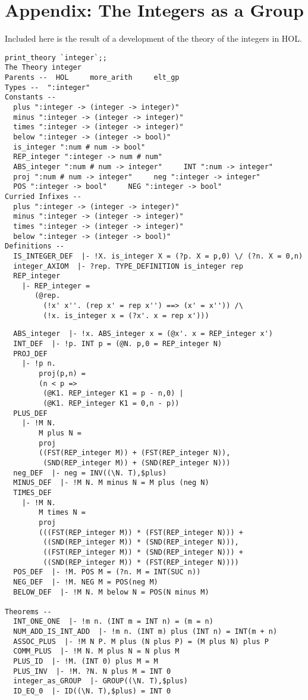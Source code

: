 \section{Appendix: The Integers as a Group}

Included here is the result of a development of the theory of the integers
in HOL.

\begin{verbatim}
print_theory `integer`;;
The Theory integer
Parents --  HOL     more_arith     elt_gp     
Types --  ":integer"     
Constants --
  plus ":integer -> (integer -> integer)"
  minus ":integer -> (integer -> integer)"
  times ":integer -> (integer -> integer)"
  below ":integer -> (integer -> bool)"
  is_integer ":num # num -> bool"
  REP_integer ":integer -> num # num"
  ABS_integer ":num # num -> integer"     INT ":num -> integer"
  proj ":num # num -> integer"     neg ":integer -> integer"
  POS ":integer -> bool"     NEG ":integer -> bool"     
Curried Infixes --
  plus ":integer -> (integer -> integer)"
  minus ":integer -> (integer -> integer)"
  times ":integer -> (integer -> integer)"
  below ":integer -> (integer -> bool)"     
Definitions --
  IS_INTEGER_DEF  |- !X. is_integer X = (?p. X = p,0) \/ (?n. X = 0,n)
  integer_AXIOM  |- ?rep. TYPE_DEFINITION is_integer rep
  REP_integer
    |- REP_integer =
       (@rep.
         (!x' x''. (rep x' = rep x'') ==> (x' = x'')) /\
         (!x. is_integer x = (?x'. x = rep x')))
\end{verbatim}
\newpage
\begin{verbatim}
  ABS_integer  |- !x. ABS_integer x = (@x'. x = REP_integer x')
  INT_DEF  |- !p. INT p = (@N. p,0 = REP_integer N)
  PROJ_DEF
    |- !p n.
        proj(p,n) =
        (n < p => 
         (@K1. REP_integer K1 = p - n,0) | 
         (@K1. REP_integer K1 = 0,n - p))
  PLUS_DEF
    |- !M N.
        M plus N =
        proj
        ((FST(REP_integer M)) + (FST(REP_integer N)),
         (SND(REP_integer M)) + (SND(REP_integer N)))
  neg_DEF  |- neg = INV((\N. T),$plus)
  MINUS_DEF  |- !M N. M minus N = M plus (neg N)
  TIMES_DEF
    |- !M N.
        M times N =
        proj
        (((FST(REP_integer M)) * (FST(REP_integer N))) +
         ((SND(REP_integer M)) * (SND(REP_integer N))),
         ((FST(REP_integer M)) * (SND(REP_integer N))) +
         ((SND(REP_integer M)) * (FST(REP_integer N))))
  POS_DEF  |- !M. POS M = (?n. M = INT(SUC n))
  NEG_DEF  |- !M. NEG M = POS(neg M)
  BELOW_DEF  |- !M N. M below N = POS(N minus M)

Theorems --
  INT_ONE_ONE  |- !m n. (INT m = INT n) = (m = n)
  NUM_ADD_IS_INT_ADD  |- !m n. (INT m) plus (INT n) = INT(m + n)
  ASSOC_PLUS  |- !M N P. M plus (N plus P) = (M plus N) plus P
  COMM_PLUS  |- !M N. M plus N = N plus M
  PLUS_ID  |- !M. (INT 0) plus M = M
  PLUS_INV  |- !M. ?N. N plus M = INT 0
  integer_as_GROUP  |- GROUP((\N. T),$plus)
  ID_EQ_0  |- ID((\N. T),$plus) = INT 0
\end{verbatim}
